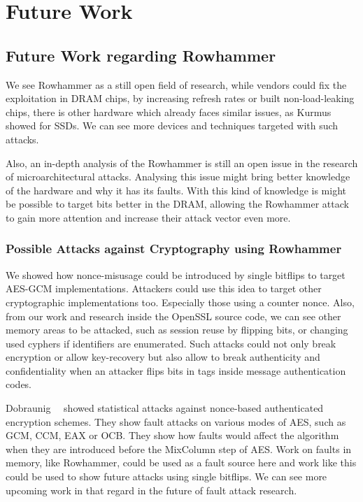 \chapter{Future Work}\label{sec:futurework}

\section{Future Work regarding Rowhammer}

We see Rowhammer as a still open field of research, while vendors could fix the
exploitation in DRAM chips, by increasing refresh rates or built
non-load-leaking chips, there is other hardware which already faces similar
issues, as Kurmus~\etal~\cite{rowssdhammer} showed for SSDs. We can see more
devices and techniques targeted with such attacks.

Also, an in-depth analysis of the Rowhammer is still an open issue in the
research of microarchitectural attacks. Analysing this issue might bring better
knowledge of the hardware and why it has its faults. With this kind of
knowledge is might be possible to target bits better in the DRAM, allowing the
Rowhammer attack to gain more attention and increase their attack vector even
more.

\subsection{Possible Attacks against Cryptography using Rowhammer}

We showed how nonce-misusage could be introduced by single bitflips to target
AES-GCM implementations. Attackers could use this idea to target other
cryptographic implementations too. Especially those using a counter nonce. Also,
from our work and research inside the OpenSSL source code, we can see other
memory areas to be attacked, such as session reuse by flipping bits, or changing
used cyphers if identifiers are enumerated. Such attacks could not only break
encryption or allow key-recovery but also allow to break authenticity and
confidentiality when an attacker flips bits in tags inside message
authentication codes.

Dobraunig~\etal~\cite{noncestat} showed statistical attacks against nonce-based
authenticated encryption schemes. They show fault attacks on various modes of
AES, such as GCM, CCM, EAX or OCB. They show how faults would affect the
algorithm when they are introduced before the MixColumn step of AES. Work on
faults in memory, like Rowhammer, could be used as a fault source here and work
like this could be used to show future attacks using single bitflips. We can see
more upcoming work in that regard in the future of fault attack research.

